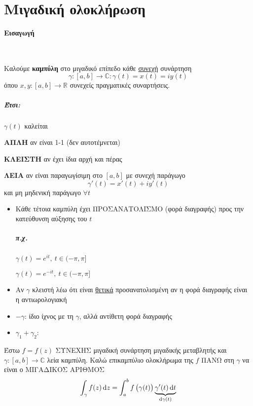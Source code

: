 \documentclass[12pt,a4paper,titlepage,fleqn]{article}
\begin{document}
	\section{Μιγαδική ολοκλήρωση}
	\paragraph{Εισαγωγή} \hspace{0pt}\\
	
	\begin{defn*}{}
        Καλούμε \textbf{καμπύλη} στο μιγαδικό επίπεδο κάθε \underline{συνεχή} συνάρτηση
        \[
        \gamma:[a,b]\to\mathbb C :\gamma(t)=x(t)=iy(t)
        \]
        όπου \( x,y:[a,b]\to\mathbb R  \) συνεχείς πραγματικές συναρτήσεις.
	\end{defn*}
	
	\subparagraph{Έτσι:} \( \gamma(t) \) καλείται
	\begin{invitemize}
		\item \textbf{ΑΠΛΗ} αν είναι 1-1 (δεν αυτοτέμνεται)
		\item \textbf{ΚΛΕΙΣΤΗ} αν έχει ίδια αρχή και πέρας
		\item \textbf{ΛΕΙΑ} αν είναι παραγωγίσιμη στο \( [a,b] \) με συνεχή παράγωγο
		\[
		\gamma'(t)=x'(t)+iy'(t)
		\]
		και μη μηδενική παράγωγο \( \forall t \)
	\end{invitemize}
	\begin{itemize}
		\item Κάθε τέτοια καμπύλη έχει ΠΡΟΣΑΝΑΤΟΛΙΣΜΟ (φορά διαγραφής) προς την
		κατεύθυνση αύξησης του \( t \)
		\subparagraph{π.χ.} \( \gamma(t)=e^{it},\ t\in(-\pi,\pi] \)
		
		\( \gamma(t)=e^{-it},\ t\in(-\pi,\pi] \) %
		
		\item Αν \( \gamma \) κλειστή λέω ότι είναι \underline{θετικά}
		προσανατολισμένη αν η φορά διαγραφής είναι η αντιωρολογιακή
		
		\item \( -\gamma \): ίδιο ίχνος με τη \( \gamma \), αλλά
		αντίθετη φορά διαγραφής
		
		\item \( \gamma_1+\gamma_2 \): %
	\end{itemize}
	
	\begin{defn*}{}
		Έστω \( f=f(z) \) ΣΥΝΕΧΗΣ μιγαδική συνάρτηση μιγαδικής μεταβλητής και
		\( \gamma:[a,b]\to\mathbb C  \) λεία καμπύλη. Καλώ επικαμπύλιο ολοκλήρωμα
		της \( f \) ΠΑΝΩ στη \( \gamma \) να είναι ο ΜΙΓΑΔΙΚΟΣ ΑΡΙΘΜΟΣ
		\[
		\int_\gamma f(z)\dif z = \int_a^b f\left(\gamma(t)\right)
		\underbrace{\gamma'(t)\dif t}_{\dif\gamma(t)}
		\]
	\end{defn*}
\end{document}
